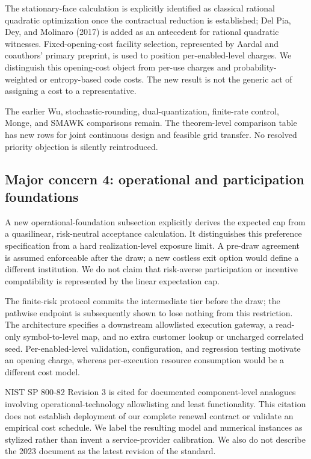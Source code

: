 \documentclass[11pt,letterpaper]{article}
\begin{document}
The stationary-face calculation is explicitly identified as classical rational quadratic optimization once the contractual reduction is established; Del Pia, Dey, and Molinaro (2017) is added as an antecedent for rational quadratic witnesses. Fixed-opening-cost facility selection, represented by Aardal and coauthors' primary preprint, is used to position per-enabled-level charges. We distinguish this opening-cost object from per-use charges and probability-weighted or entropy-based code costs. The new result is not the generic act of assigning a cost to a representative.



The earlier Wu, stochastic-rounding, dual-quantization, finite-rate control, Monge, and SMAWK comparisons remain. The theorem-level comparison table has new rows for joint continuous design and feasible grid transfer. No resolved priority objection is silently reintroduced.



\subsection*{Major concern 4: operational and participation foundations}


A new operational-foundation subsection explicitly derives the expected cap from a quasilinear, risk-neutral acceptance calculation. It distinguishes this preference specification from a hard realization-level exposure limit. A pre-draw agreement is assumed enforceable after the draw; a new costless exit option would define a different institution. We do not claim that risk-averse participation or incentive compatibility is represented by the linear expectation cap.



The finite-risk protocol commits the intermediate tier before the draw; the pathwise endpoint is subsequently shown to lose nothing from this restriction. The architecture specifies a downstream allowlisted execution gateway, a read-only symbol-to-level map, and no extra customer lookup or uncharged correlated seed. Per-enabled-level validation, configuration, and regression testing motivate an opening charge, whereas per-execution resource consumption would be a different cost model.



NIST SP 800-82 Revision 3 is cited for documented component-level analogues involving operational-technology allowlisting and least functionality. This citation does not establish deployment of our complete renewal contract or validate an empirical cost schedule. We label the resulting model and numerical instances as stylized rather than invent a service-provider calibration. We also do not describe the 2023 document as the latest revision of the standard.
\end{document}
